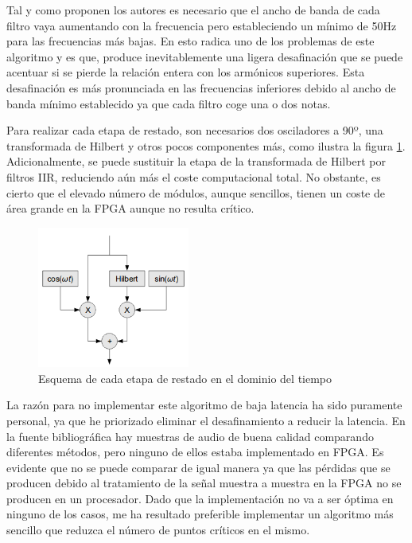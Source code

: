 Tal y como proponen los autores es necesario que el ancho de banda de cada filtro vaya aumentando con la frecuencia pero estableciendo un mínimo de 50Hz para las frecuencias más bajas. En esto radica uno de los problemas de este algoritmo y es que, produce inevitablemente una ligera desafinación que se puede acentuar si se pierde la relación entera con los armónicos superiores. Esta desafinación es más pronunciada en las frecuencias inferiores debido al ancho de banda mínimo establecido ya que cada filtro coge una o dos notas.

Para realizar cada etapa de restado, son necesarios dos osciladores a 90º, una transformada de Hilbert y otros pocos componentes más, como ilustra la figura \ref{fig:restahil}. Adicionalmente, se puede sustituir la etapa de la transformada de Hilbert por filtros IIR, reduciendo aún más el coste computacional total. No obstante, es cierto que el elevado número de módulos, aunque sencillos, tienen un coste de área grande en la FPGA aunque no resulta crítico.

\begin{figure}[!t]
\begin{center}
\includegraphics[width=5cm]{img/fs_hilbert.png}
\caption{\label{fig:restahil}Esquema de cada etapa de restado en el dominio del tiempo}
\end{center}
\end{figure}

La razón para no implementar este algoritmo de baja latencia ha sido puramente personal, ya que he priorizado eliminar el desafinamiento a reducir la latencia. En la fuente bibliográfica \cite{hilbert} hay muestras de audio de buena calidad comparando diferentes métodos, pero ninguno de ellos estaba implementado en FPGA. Es evidente que no se puede comparar de igual manera ya que las pérdidas que se producen debido al tratamiento de la señal muestra a muestra en la FPGA no se producen en un procesador. Dado que la implementación no va a ser óptima en ninguno de los casos, me ha resultado preferible implementar un algoritmo más sencillo que reduzca el número de puntos críticos en el mismo.

